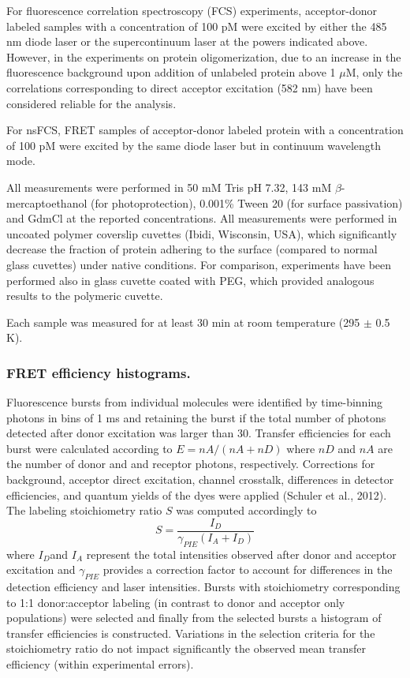 \documentclass[../main.tex]{subfiles}
\begin{document}
        For fluorescence correlation spectroscopy (FCS) experiments, acceptor-donor labeled samples with a concentration of 100 pM were excited by either the 485 nm diode laser or the supercontinuum laser at the powers indicated above. However, in the experiments on  protein oligomerization, due to an increase in the fluorescence background upon addition of unlabeled protein above 1 $\mu$M, only the correlations corresponding to direct acceptor excitation (582 nm) have been considered reliable for the  analysis.  

        For nsFCS, FRET samples of acceptor-donor labeled protein with a concentration of 100 pM were excited by the same diode laser but in continuum wavelength mode.

        All measurements were performed in 50 mM Tris pH 7.32, 143 mM $\beta$-mercaptoethanol (for photoprotection), 0.001\% Tween 20 (for surface passivation) and GdmCl at the reported concentrations. All measurements were performed in uncoated polymer coverslip cuvettes (Ibidi, Wisconsin, USA), which significantly decrease the fraction of protein adhering to the surface (compared to normal glass cuvettes) under native conditions. For comparison, experiments have been performed also in glass cuvette coated with PEG, which provided analogous results to the polymeric cuvette. 

        Each sample was measured for at least 30 min at room temperature (295 $\pm$ 0.5 K). 

    \subsubsection{FRET efficiency histograms. }
        Fluorescence bursts from individual molecules were identified by time-binning photons in bins of 1 ms and retaining the burst if the total number of photons detected after donor excitation was larger than 30. Transfer efficiencies for each burst were calculated according to $E=nA/(nA+nD)$ where $nD$ and $nA$ are the number of donor and and receptor photons, respectively. Corrections for background, acceptor direct excitation, channel crosstalk, differences in detector efficiencies, and quantum yields of the dyes were applied (Schuler et al., 2012). The labeling stoichiometry ratio $S$ was computed accordingly to 
        \begin{equation}\label{appendix-e-eq1}
            S=\frac{I_{D}}{\gamma_{PIE}(I_A+I_D)}
        \end{equation}
        where $I_{D}$and $I_{A}$ represent the total intensities observed after donor and acceptor excitation and $\gamma_{PIE}$ provides a correction factor to account for differences in the detection efficiency and laser intensities. Bursts with stoichiometry corresponding to 1:1 donor:acceptor labeling (in contrast to donor and acceptor only populations) were selected and finally from the selected bursts a histogram of transfer efficiencies is constructed. Variations in the selection criteria for the stoichiometry ratio do not impact significantly the observed mean transfer efficiency (within experimental errors). 
\end{document}
